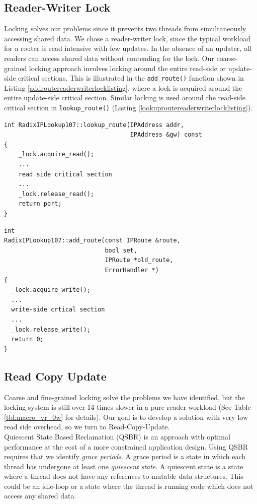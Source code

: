 \documentclass[a4paper,marginparwidth=50pt,marginparsep=10pt]{article}
\begin{document}
\subsection{Reader-Writer Lock}
Locking solves our problems since it prevents two threads from simultaneously accessing shared data. We chose a reader-writer lock, since the typical workload for a router is read intensive with few updates. In the absence of an updater, all readers can access shared data without contending for the lock. 
 Our coarse-grained locking approach involves locking around the entire read-side or update-side critical sections. This is illustrated in the \verb+add_route()+ function shown in Listing \ref{addroutereaderwriterlocklisting}, where a lock is acquired around the entire update-side critical section. Similar locking is used around the read-side critical section in \verb+lookup_route()+ (Listing \ref{lookuproutereaderwriterlocklisting}).
\begin{lstlisting}[caption = Reader-writer lock usage in lookup\_route(), label=lookuproutereaderwriterlocklisting,float=tph]
int RadixIPLookup107::lookup_route(IPAddress addr, 
                                   IPAddress &gw) const
{  
    _lock.acquire_read();
    ...
    read side critical section
    ...
    _lock.release_read();
    return port;
}
\end{lstlisting}
\begin{lstlisting}[caption = Reader-writer lock usage in add\_route(), label=addroutereaderwriterlocklisting,float=tph]
int
RadixIPLookup107::add_route(const IPRoute &route, 
                            bool set, 
                            IPRoute *old_route, 
                            ErrorHandler *)
{
  _lock.acquire_write();
  ...
  write-side crtical section
  ...
  _lock.release_write();
  return 0;
}
\end{lstlisting}
\pagebreak
\subsection{Read Copy Update}

\label{sec:rcu}
Coarse and fine-grained locking solve the problems we have identified, but the locking system is still over 14 times slower in a pure reader workload (See Table \ref{tbl:macro_vr_0w} for details). Our goal is to develop a solution with very low read side overhead, so we turn to Read-Copy-Update.\\

Quiescent State Based Reclamation (QSBR) is an approach with optimal performance at the cost of a more constrained application design\cite{hart}. Using QSBR requires that we identify \emph{grace periods}. A grace period is a state in which each thread has undergone at least one \emph{quiescent state}. A quiescent state is a state where a thread does not have any references to mutable data structures. This could be an idle-loop or a state where the thread is running code which does not access any shared data.\\
\end{document}

